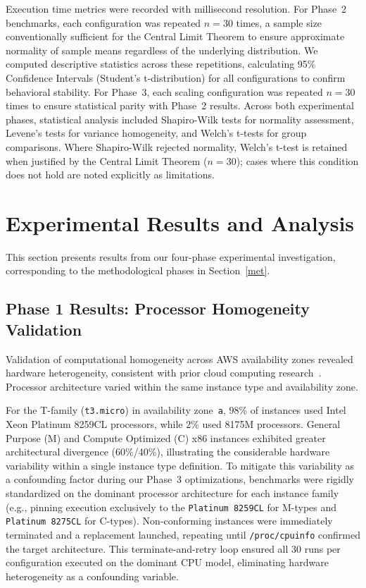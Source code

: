 \documentclass[conference]{IEEEtran}
\begin{document}
Execution time metrics were recorded with millisecond resolution. For Phase~2
benchmarks, each configuration was repeated $n=30$ times, a sample size conventionally sufficient for the Central Limit Theorem to ensure approximate normality of sample means regardless of the underlying distribution. We computed descriptive
statistics across these repetitions, calculating 95\% Confidence Intervals
(Student's t-distribution) for all configurations to confirm behavioral
stability. For Phase~3, each scaling configuration was repeated $n=30$ times
to ensure statistical parity with Phase~2 results. Across both experimental phases,
statistical analysis included Shapiro-Wilk tests for normality assessment,
Levene's tests for variance homogeneity, and Welch's t-tests for group
comparisons. Where Shapiro-Wilk rejected normality, Welch's t-test is retained when justified by the Central Limit Theorem ($n=30$); cases where this condition does not hold are noted explicitly as limitations.

\section{Experimental Results and Analysis}
\label{experiments}

This section presents results from our four-phase experimental investigation,
corresponding to the methodological phases in Section~\ref{met}.

\subsection{Phase 1 Results: Processor Homogeneity Validation}

Validation of computational homogeneity across AWS availability zones revealed
hardware heterogeneity, consistent with prior cloud computing
research~\cite{b5, b6}. Processor architecture varied within the same instance type and availability zone.

For the T-family (\texttt{t3.micro}) in availability zone~\texttt{a}, 98\% of
instances used Intel Xeon Platinum 8259CL processors, while 2\% used 8175M
processors. General Purpose (M) and Compute Optimized (C) x86 instances exhibited greater architectural
divergence (60\%/40\%), illustrating the considerable hardware variability within
a single instance type definition. To mitigate this variability as a
confounding factor during our Phase~3 optimizations, benchmarks were rigidly standardized on the dominant processor
architecture for each instance family (e.g., pinning execution exclusively to the \texttt{Platinum 8259CL} for M-types and \texttt{Platinum 8275CL} for C-types). Non-conforming instances were immediately terminated and a replacement
launched, repeating until \texttt{/proc/cpuinfo} confirmed the target
architecture. This terminate-and-retry loop ensured all 30 runs per
configuration executed on the dominant CPU model, eliminating hardware
heterogeneity as a confounding variable.
\end{document}
